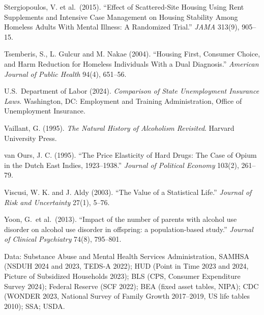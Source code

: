 \documentclass[10pt]{article}
\begin{document}
{\begin{list}{}{\setlength{\leftmargin}{1.5em}\setlength{\itemindent}{-1.5em}\setlength{\itemsep}{0.35em}\setlength{\parsep}{0em}}
\item Stergiopoulos, V. et al.\ (2015). ``Effect of Scattered-Site Housing Using Rent Supplements and Intensive Case Management on Housing Stability Among Homeless Adults With Mental Illness: A Randomized Trial.'' \emph{JAMA} 313(9), 905--15.
\item Tsemberis, S., L. Gulcur and M. Nakae (2004). ``Housing First, Consumer Choice, and Harm Reduction for Homeless Individuals With a Dual Diagnosis.'' \emph{American Journal of Public Health} 94(4), 651--56.
\item U.S.\ Department of Labor (2024). \emph{Comparison of State Unemployment
Insurance Laws}. Washington, DC: Employment and Training Administration, Office of
Unemployment Insurance.
\item Vaillant, G. (1995). \emph{The Natural History of Alcoholism Revisited}. Harvard University Press.
\item van Ours, J. C. (1995). ``The Price Elasticity of Hard Drugs: The Case of Opium in the Dutch East Indies, 1923--1938.'' \emph{Journal of Political Economy} 103(2), 261--79.
\item Viscusi, W. K. and J. Aldy (2003). ``The Value of a Statistical Life.'' \emph{Journal of Risk and Uncertainty} 27(1), 5--76.
\item Yoon, G.\ et al.\ (2013). ``Impact of the number of parents with alcohol use disorder on alcohol use disorder in offspring: a population-based study.'' \emph{Journal of Clinical Psychiatry} 74(8), 795--801.
\end{list}

\noindent Data: Substance Abuse and Mental Health Services Administration, SAMHSA (NSDUH 2024 and 2023, TEDS-A 2022); HUD (Point in Time 2023 and 2024, Picture of Subsidized Households 2023); BLS (CPS, Consumer Expenditure Survey 2024); Federal Reserve (SCF 2022); BEA (fixed asset tables, NIPA); CDC (WONDER 2023, National Survey of Family Growth 2017--2019, US life tables 2010); SSA; USDA.\par}
\end{document}
